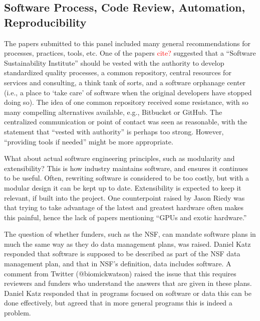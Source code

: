 \documentclass[11pt, oneside]{amsart}
\newcommand{\note}[1]{ {\textcolor{red}    { #1 }}}
\begin{document}
\subsection{Software Process, Code Review, Automation, Reproducibility}

The papers submitted to this panel included many general
recommendations for processes, practices, tools, etc. One of the
papers 
\note{cite?}  
suggested that a ``Software Sustainability
Institute'' should be vested with the authority to develop
standardized quality processes, a common repository, central resources
for services and consulting, a think tank of sorts, and a software
orphanage center (i.e., a place to `take care' of software when the
original developers have stopped doing so).  The idea of one common
repository received some resistance, with so many compelling
alternatives available, e.g., Bitbucket or GitHub. The centralized
communication or point of contact was seen as reasonable, with the
statement that ``vested with authority'' is perhaps too strong. However,
``providing tools if needed'' might be more appropriate.

What about actual software engineering principles, such as modularity
and extensibility? This is how industry maintains software, and
ensures it continues to be useful. Often, rewriting software is
considered to be too costly, but with a modular design it can be kept
up to date. Extensibility is expected to keep it relevant, if built
into the project. One counterpoint raised by Jason Riedy was that
trying to take advantage of the latest and greatest hardware often
makes this painful, hence the lack of papers mentioning ``GPUs and
exotic hardware.''

The question of whether funders, such as the NSF, can mandate software
plans in much the same way as they do data management plans, was
raised. Daniel Katz responded that software is supposed to be
described as part of the NSF data management plan, and that in NSF's
definition, data includes software. A comment from Twitter
(@biomickwatson) raised the issue that this requires reviewers and
funders who understand the answers that are given in these
plans. Daniel Katz responded that in programs focused on software or
data this can be done effectively, but agreed that in more general
programs this is indeed a problem.
\end{document}
